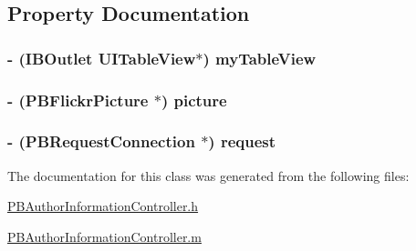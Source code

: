 \subsection{Property Documentation}
\hypertarget{interface_p_b_author_information_controller_add75b66dc13236a5c90f3f936f36d191}{
\subsubsection[{myTableView}]{\setlength{\rightskip}{0pt plus 5cm}-\/ (IBOutlet UITableView$\ast$) myTableView}}
\label{interface_p_b_author_information_controller_add75b66dc13236a5c90f3f936f36d191}
\hypertarget{interface_p_b_author_information_controller_a8e8f1764e92824eb69d5aa60ab1c2c77}{
\subsubsection[{picture}]{\setlength{\rightskip}{0pt plus 5cm}-\/ ({\bf PBFlickrPicture} $\ast$) picture}}
\label{interface_p_b_author_information_controller_a8e8f1764e92824eb69d5aa60ab1c2c77}
\hypertarget{interface_p_b_author_information_controller_a8fce7f9a4125c781da4f57a036811156}{
\subsubsection[{request}]{\setlength{\rightskip}{0pt plus 5cm}-\/ ({\bf PBRequestConnection} $\ast$) request}}
\label{interface_p_b_author_information_controller_a8fce7f9a4125c781da4f57a036811156}


The documentation for this class was generated from the following files:\begin{DoxyCompactItemize}
\item 
\hyperlink{_p_b_author_information_controller_8h}{PBAuthorInformationController.h}\item 
\hyperlink{_p_b_author_information_controller_8m}{PBAuthorInformationController.m}\end{DoxyCompactItemize}
